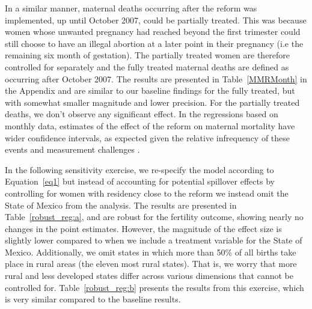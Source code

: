 \documentclass[a4paper, 11pt]{article}
\begin{document}
\begin{spacing}{2}
In a similar manner, maternal deaths occurring after the reform was implemented, up until October 2007, could be partially treated. This was because  women whose unwanted pregnancy had reached beyond the first trimester could still choose to have an illegal abortion at a later point in their pregnancy (i.e the remaining six month of gestation). The partially treated women are therefore controlled for separately and the fully treated maternal deaths are defined as occurring after October 2007. The results are presented in Table~\ref{MMRMonth} in the Appendix and are similar to our baseline findings for the fully treated, but with somewhat smaller magnitude and lower precision. For the partially treated deaths, we don't observe any significant effect. In the regressions based on monthly data, estimates of the effect of the reform on maternal mortality have wider confidence intervals, as expected given the relative infrequency of these events and measurement challenges \citep{hogan2010maternal}. 


In the following sensitivity exercise, we re-specify the model according to Equation~\eqref{eq1} but instead of accounting for potential spillover effects by controlling for women with residency close to the reform we instead omit the State of Mexico from the analysis. The results are presented in Table~\ref{robust_reg:a}, and are robust for the fertility outcome, showing nearly no changes in the point estimates. However, the magnitude of the effect size is slightly lower compared to when we include a treatment variable for the State of Mexico. Additionally, we omit states in which more than 50\% of all births take place in rural areas (the eleven most rural states). That is, we worry that more rural and less developed states differ across various dimensions that cannot be controlled for. Table~\ref{robust_reg:b} presents the results from this exercise, which is very similar compared to the baseline results.     



\end{spacing}
\end{document}
